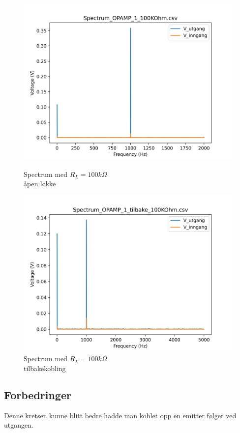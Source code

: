 \begin{figure}[!h]
    \begin{minipage}[c]{0.5\textwidth}
        \centering
        \includegraphics[width=1\textwidth]{Bilder/Spectrum_OPAMP_1_100KOhm.png}
        \caption{Spectrum med $R_L = 100k\Omega$\\ åpen løkke}
        \label{fig:Spectrum_OPAMP_1_100KOhm}
    \end{minipage}
    \hfill
    \begin{minipage}[c]{0.5\textwidth}
        \centering
        \includegraphics[width=1\textwidth]{Bilder/Spectrum_OPAMP_1_tilbake_100KOhm.png}
        \caption{Spectrum med $R_L = 100k\Omega$\\ tilbakekobling}
        \label{fig:Spectrum_OPAMP_1_tilbake_100KOhm}
    \end{minipage}
\end{figure}

\subsection{Forbedringer}
\label{forbedringer}
Denne kretsen kunne blitt bedre hadde man koblet opp en emitter følger ved utgangen.